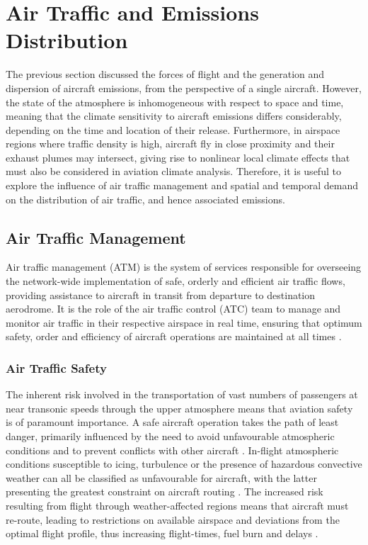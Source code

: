 \section{Air Traffic and Emissions Distribution}
\label{airtraf_2.4}
The previous section discussed the forces of flight and the generation and dispersion of aircraft emissions, from the perspective of a single aircraft. However, the state of the atmosphere is inhomogeneous with respect to space and time, meaning that the climate sensitivity to aircraft emissions differs considerably, depending on the time and location of their release. Furthermore, in airspace regions where traffic density is high, aircraft fly in close proximity and their exhaust plumes may intersect, giving rise to nonlinear local climate effects that must also be considered in aviation climate analysis. Therefore, it is useful to explore the influence of air traffic management and spatial and temporal demand on the distribution of air traffic, and hence associated emissions. 

\subsection{Air Traffic Management}
Air traffic management (ATM) is the system of services responsible for overseeing the network-wide implementation of safe, orderly and efficient air traffic flows, providing assistance to aircraft in transit from departure to destination aerodrome. It is the role of the air traffic control (ATC) team to manage and monitor air traffic in their respective airspace in real time, ensuring that optimum safety, order and efficiency of aircraft operations are maintained at all times \cite{SecretariatGeneral2016}. 


\subsubsection{Air Traffic Safety} 
The inherent risk involved in the transportation of vast numbers of passengers at near transonic speeds through the upper atmosphere means that aviation safety is of paramount importance. A safe aircraft operation takes the path of least danger, primarily influenced by the need to avoid unfavourable atmospheric conditions and to prevent conflicts with other aircraft \cite{Zhang2012, Baumgartner2007}. In-flight atmospheric conditions susceptible to icing, turbulence or the presence of hazardous convective weather can all be classified as unfavourable for aircraft, with the latter presenting the greatest constraint on aircraft routing \cite{Mitchell2006, Krozel2007}. The increased risk resulting from flight through weather-affected regions means that aircraft must re-route, leading to restrictions on available airspace and deviations from the optimal flight profile, thus increasing flight-times, fuel burn and delays \cite{weather_delay_2021}.


